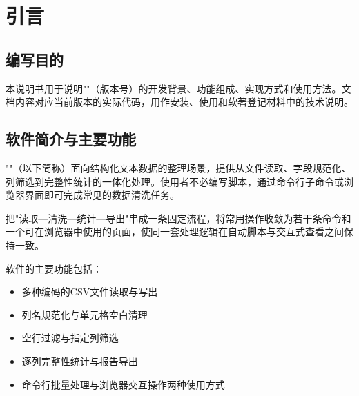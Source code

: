 %
%

\section{引言}
\label{sec:introduction}

\subsection{编写目的}
\label{ssec:intro_purpose}
本说明书用于说明"\Name"（版本号\Version）的开发背景、功能组成、实现方式和使用方法。文档内容对应当前版本的实际代码，用作安装、使用和软著登记材料中的技术说明。

\subsection{软件简介与主要功能}
\label{ssec:intro_summary}
"\Name"（以下简称\Name）面向结构化文本数据的整理场景，提供从文件读取、字段规范化、列筛选到完整性统计的一体化处理。使用者不必编写脚本，通过命令行子命令或浏览器界面即可完成常见的数据清洗任务。

\Name{}把"读取—清洗—统计—导出"串成一条固定流程，将常用操作收敛为若干条命令和一个可在浏览器中使用的页面，使同一套处理逻辑在自动脚本与交互式查看之间保持一致。

软件的主要功能包括：
\begin{itemize}
    \item 多种编码的CSV文件读取与写出
    \item 列名规范化与单元格空白清理
    \item 空行过滤与指定列筛选
    \item 逐列完整性统计与报告导出
    \item 命令行批量处理与浏览器交互操作两种使用方式
\end{itemize}

